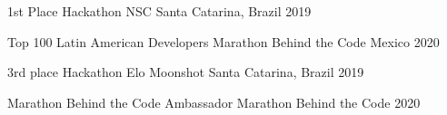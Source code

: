


\begin{cvhonors}

  \cvhonor
    {1st Place} %
    {Hackathon NSC} %
    {Santa Catarina, Brazil} %
    {2019} %

  \cvhonor
    {Top 100 Latin American Developers} %
    {Marathon Behind the Code} %
    {Mexico} %
    {2020} %

  \cvhonor
    {3rd place} %
    {Hackathon Elo Moonshot} %
    {Santa Catarina, Brazil} %
    {2019} %


\end{cvhonors}


\begin{cvhonors}

  \cvhonor
    {Marathon Behind the Code Ambassador} %
    {Marathon Behind the Code} %
    {} %
    {2020} %

\end{cvhonors}
